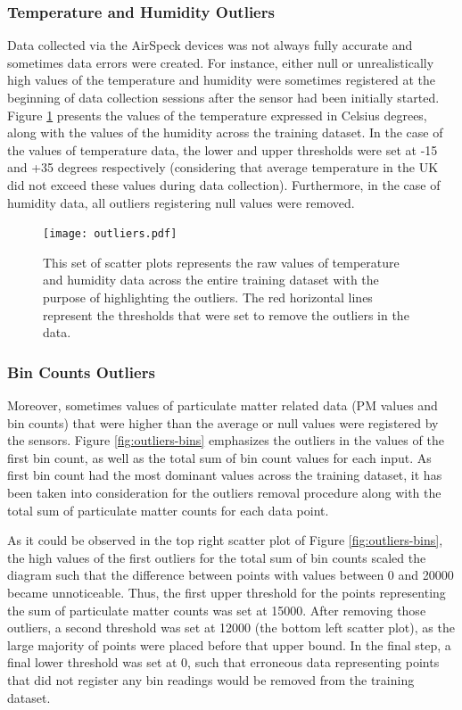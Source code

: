 \documentclass[bsc,frontabs,twoside,singlespacing, parskip,deptreport]{infthesis}     %
\begin{document}
\subsubsection*{Temperature and Humidity Outliers}

Data collected via the AirSpeck devices was not always fully accurate and sometimes data errors were created. For instance, either null or unrealistically high values of the temperature and humidity were sometimes registered at the beginning of data collection sessions after the sensor had been initially started. Figure \ref{fig:outliers} presents the values of the temperature expressed in Celsius degrees, along with the values of the humidity across the training dataset. In the case of the values of temperature data, the lower and upper thresholds were set at -15 and +35 degrees respectively (considering that average temperature in the UK did not exceed these values during data collection). Furthermore, in the case of humidity data, all outliers registering null values were removed.

\begin{figure}[h!]
  \center
  \texttt{[image: outliers.pdf]}
  \caption{This set of scatter plots represents the raw values of temperature and humidity data across the entire training dataset with the purpose of highlighting the outliers. The red horizontal lines represent the thresholds that were set to remove the outliers in the data.}
  \label{fig:outliers}
\end{figure}

\subsubsection*{Bin Counts Outliers}

Moreover, sometimes values of particulate matter related data (PM values and bin counts) that were higher than the average or null values were registered by the sensors. Figure \ref{fig:outliers-bins} emphasizes the outliers in the values of the first bin count, as well as the total sum of bin count values for each input. As first bin count had the most dominant values across the training dataset, it has been taken into consideration for the outliers removal procedure along with the total sum of particulate matter counts for each data point.

As it could be observed in the top right scatter plot of Figure \ref{fig:outliers-bins}, the high values of the first outliers for the total sum of bin counts scaled the diagram such that the difference between points with values between 0 and 20000 became unnoticeable. Thus, the first upper threshold for the points representing the sum of particulate matter counts was set at 15000. After removing those outliers, a second threshold was set at 12000 (the bottom left scatter plot), as the large majority of points were placed before that upper bound. In the final step, a final lower threshold was set at 0, such that erroneous data representing points that did not register any bin readings would be removed from the training dataset.
\end{document}
